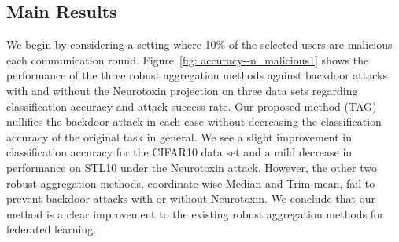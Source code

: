 \documentclass{article} %
\begin{document}
\subsection{Main Results}

We begin by considering a setting where 10\% of the selected users are malicious each communication round. Figure~\ref{fig: accuracy--n_malicious1} shows the performance of the three robust aggregation methods against backdoor attacks with and without the Neurotoxin projection on three data sets regarding classification accuracy and attack success rate. Our proposed method (TAG) nullifies the backdoor attack in each case without decreasing the classification accuracy of the original task in general. We see a slight improvement in classification accuracy for the CIFAR10 data set and a mild decrease in performance on STL10 under the Neurotoxin attack. However, the other two robust aggregation methods, coordinate-wise Median and Trim-mean, fail to prevent backdoor attacks with or without Neurotoxin. We conclude that our method is a clear improvement to the existing robust aggregation methods for federated learning. 
\end{document}
